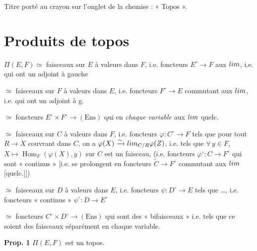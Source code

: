 \documentclass[11pt,a4paper]{article}
\begin{document}
Titre porté au crayon sur l'onglet de la chemise : « Topos ».

\section*{Produits de topos}

$\Pi(E,F) \simeq$ faisceaux sur $E$ à valeurs dans $F$, i.e. foncteurs
$E^{\circ} \to F$ \struck{\ill{}} aux $\varprojlim$, i.e. qui ont un adjoint à
gauche

$\simeq$ faisceaux sur $F$ à valeurs dans $E$, i.e. foncteurs $F^{\circ} \to E$
commutant aux $\varprojlim$, i.e. qui ont un adjoint à g.

$\simeq$ foncteurs $E^{\circ} \times F^{\circ} \to (\mathrm{Ens})$ qui
\struck{\ill{}} en \emph{chaque variable} aux $\varprojlim$ quelc.

$\simeq$ faisceaux sur $C$ à valeurs dans $F$, i.e. foncteurs
$\varphi : C^{\circ} \to F$ tels que pour tout $R \to X$ couvrant dans $C$, on a
$\varphi(X) \xrightarrow{\sim} \varprojlim_{C/R} \varphi(Z)$, i.e. tels que
$\forall\, y \in F$, $X \mapsto \operatorname{Hom}_{F}(\varphi(X), y)$
sur $C$ est un faisceau,  (i.e. \struck{\ill{}} foncteurs
$\varphi^{\circ} : C \to F^{\circ}$ qui sont « continus » [i.e. se prolongent en
foncteurs $\widetilde{C} \to F^{\circ}$ commutant aux $\varinjlim$ [quelc.]])

$\simeq$ faisceaux sur $D$ à valeurs dans $E$, i.e. foncteurs
$\psi : D^{\circ} \to E$ tels que \ldots, i.e. foncteurs « continus »
$\psi^{\circ} : D \to E^{\circ}$

$\simeq$ foncteurs $C^{\circ} \times D^{\circ} \to (\mathrm{Ens})$ qui sont des
« bifaisceaux » i.e. tels que ce soient des faisceaux séparément en chaque
variable.


\textbf{Prop. 1} \quad $\Pi(E,F)$ est un topos.
\end{document}
